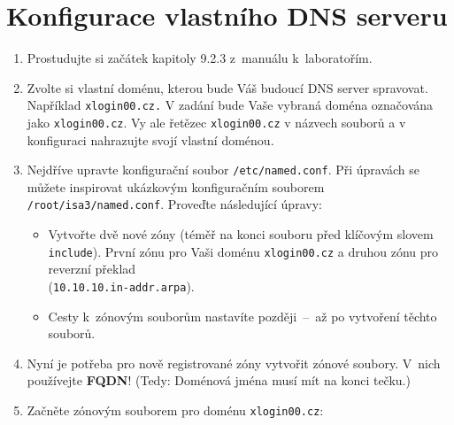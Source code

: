 \section{Konfigurace vlastního DNS serveru}
\begin{enumerate}
  \item Prostudujte si začátek kapitoly 9.2.3 z~manuálu k~laboratořím.
  \item Zvolte si vlastní doménu, kterou bude Váš budoucí DNS server spravovat. Například {\tt xlogin00.cz.} V zadání bude Vaše vybraná doména označována jako {\tt xlogin00.cz}. Vy ale řetězec {\tt xlogin00.cz} v názvech souborů a v konfiguraci nahrazujte svojí vlastní doménou.
  \item Nejdříve upravte konfigurační soubor {\tt /etc/named.conf}. Při úpravách se můžete inspirovat ukázkovým konfiguračním souborem {\tt /root/isa3/named.conf}. Proveďte následující úpravy:
    \begin{itemize}
      \item Vytvořte dvě nové zóny (téměř na konci souboru před klíčovým slovem {\tt include}). První zónu pro Vaši doménu {\tt xlogin00.cz} a druhou zónu pro reverzní překlad\\ ({\tt 10.10.10.in-addr.arpa}).
            \item Cesty k~zónovým souborům nastavíte později~--~až po vytvoření těchto souborů.
    \end{itemize}
  
  \item Nyní je potřeba pro nově registrované zóny vytvořit zónové soubory. V~nich používejte \textbf{FQDN}! (Tedy: Doménová jména musí mít na konci tečku.)
  \item Začněte zónovým souborem pro doménu {\tt xlogin00.cz}:
  

\end{enumerate}
